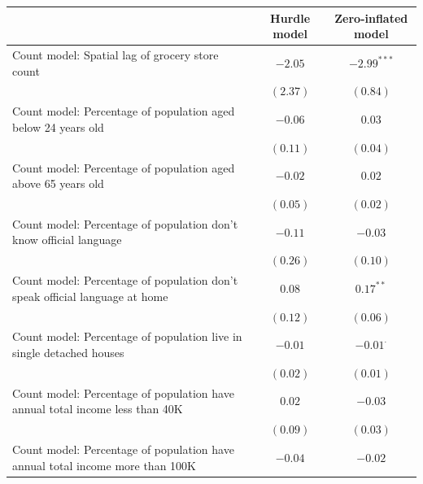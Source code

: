 \documentclass[preprint, 3p,
authoryear]{elsarticle} %
\begin{document}
\begin{table}
\begin{center}
\begin{footnotesize}
\begin{tabular}{l c c}
\hline
 & Hurdle model & Zero-inflated model \\
\hline
Count model: Spatial lag of grocery store count                               & $-2.05$      & $-2.99^{***}$   \\
                                                                              & $(2.37)$     & $(0.84)$        \\
Count model: Percentage of population aged below 24 years old                 & $-0.06$      & $0.03$          \\
                                                                              & $(0.11)$     & $(0.04)$        \\
Count model: Percentage of population aged above 65 years old                 & $-0.02$      & $0.02$          \\
                                                                              & $(0.05)$     & $(0.02)$        \\
Count model: Percentage of population don't know official language            & $-0.11$      & $-0.03$         \\
                                                                              & $(0.26)$     & $(0.10)$        \\
Count model: Percentage of population don't speak official language at home   & $0.08$       & $0.17^{**}$     \\
                                                                              & $(0.12)$     & $(0.06)$        \\
Count model: Percentage of population live in single detached houses          & $-0.01$      & $-0.01^{\cdot}$ \\
                                                                              & $(0.02)$     & $(0.01)$        \\
Count model: Percentage of population have annual total income less than 40K  & $0.02$       & $-0.03$         \\
                                                                              & $(0.09)$     & $(0.03)$        \\
Count model: Percentage of population have annual total income more than 100K & $-0.04$      & $-0.02$         \\

\end{tabular}
\end{footnotesize}
\end{center}
\end{table}
\end{document}
